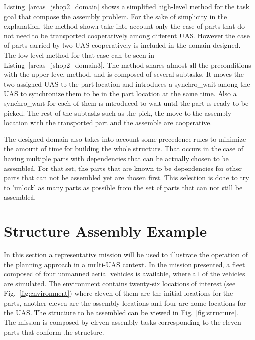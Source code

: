 \documentclass[letterpaper, 12pt, conference]{ieeeconf}    %
\begin{document}
Listing~\ref{arcas_jshop2_domain} shows a simplified high-level method for the task goal that compose the assembly problem. For the sake of simplicity in the explanation, the method shown take into account only the case of parts that do not need to be transported cooperatively among different UAS. However the case of parts carried by two UAS cooperatively is included in the domain designed. The low-level method for that case can be seen in Listing~\ref{arcas_jshop2_domain3}. The method shares almost all the preconditions with the upper-level method, and is composed of several subtasks. It moves the two assigned UAS to the part location and introduces a synchro{\_}wait among the UAS to synchronize them to be in the part location at the same time. Also a synchro{\_}wait for each of them is introduced to wait until the part is ready to be picked. The rest of the subtasks such as the pick, the move to the assembly location with the transported part and the assemble are cooperative. 



The designed domain also takes into account some precedence rules to minimize the amount of time for building the whole structure. That occurs in the case of having multiple parts with dependencies that can be actually chosen to be assembled. For that set, the parts that are known to be dependencies for other parts that can not be assembled yet are chosen first. This selection is done to try to 'unlock' as many parts as possible from the set of parts that can not still be assembled.

\section{Structure Assembly Example}
\label{sec:results}

In this section a representative mission will be used to illustrate the operation of the planning approach in a multi-UAS context. In the mission presented, a fleet composed of four unmanned aerial vehicles is available, where all of the vehicles are simulated. The environment contains twenty-six locations of interest (see Fig.~\ref{fig:environment}) where eleven of them are the initial locations for the parts, another eleven are the assembly locations and four are home locations for the UAS. The structure to be assembled can be viewed in Fig.~\ref{fig:structure}. The mission is composed by eleven assembly tasks corresponding to the eleven parts that conform the structure. 
\end{document}
